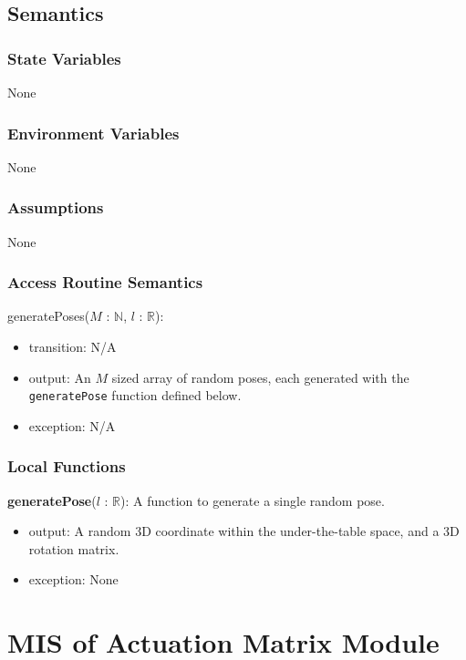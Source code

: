 \documentclass[12pt, titlepage]{article}
\begin{document}
\subsection{Semantics}

\subsubsection{State Variables}
None

\subsubsection{Environment Variables}
None

\subsubsection{Assumptions}
None 

\subsubsection{Access Routine Semantics}

\noindent generatePoses($M$ : $\mathbb{N}$, $l$ : $\mathbb{R}$):
\begin{itemize}
\item transition: N/A
\item output: An $M$ sized array of random poses, each generated with the \texttt{generatePose} function defined below.
\item exception: N/A
\end{itemize}

\subsubsection{Local Functions}
\textbf{generatePose}($l$ : $\mathbb{R}$): A function to generate a single random pose.
\begin{itemize}
  \item output: A random 3D coordinate within the under-the-table space, and a 3D rotation matrix.
  \item exception: None
\end{itemize}

\newpage

\section{MIS of Actuation Matrix Module} \label{MISActMatrix}
\end{document}
